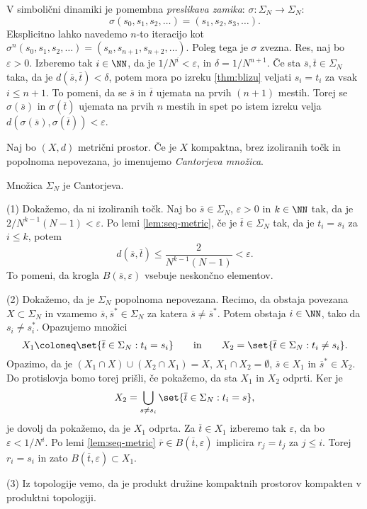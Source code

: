 V simbolični dinamiki je pomembna \emph{preslikava zamika}: \(\sigma \colon \Sigma_N \to \Sigma_N\):
\[\sigma (s_0, s_1, s_2, \dots) = (s_1, s_2, s_3, \dots).\]
Eksplicitno lahko navedemo \(n\)-to iteracijo kot \(\sigma^n (s_0, s_1, s_2, \dots) = (s_n, s_{n + 1}, s_{n + 2}, \dots)\). Poleg tega je \(\sigma\) zvezna. Res, naj bo \(\varepsilon > 0\). Izberemo tak \(i \in \NN\), da je \(1 / N^i < \varepsilon\), in \(\delta = 1 / N^{n + 1}\). Če sta \(\overline{s}, \overline{t} \in \Sigma_N\) taka, da je \(d(\overline{s}, \overline{t}) < \delta\), potem mora po izreku \ref{thm:blizu} veljati \(s_i = t_i\) za vsak \(i \leq n + 1\). To pomeni, da se \(\overline{s}\) in \(\overline{t}\) ujemata na prvih \((n + 1)\) mestih. Torej se \(\sigma (\overline{s})\) in \(\sigma (\overline{t})\) ujemata na prvih \(n\) mestih in spet po istem izreku velja \(d (\sigma (\overline{s}), \sigma (\overline{t})) < \varepsilon\).

\begin{definicija}
    Naj bo \((X, d)\) metrični prostor. Če je \(X\) kompaktna, brez izoliranih točk in popolnoma nepovezana, jo imenujemo \emph{Cantorjeva množica}.
\end{definicija}

\begin{trditev}
    Množica \(\Sigma_N\) je Cantorjeva.
\end{trditev}

\begin{dokaz}
    (1) Dokažemo, da ni izoliranih točk. Naj bo \(\overline{s} \in \Sigma_N\), \(\varepsilon > 0\) in \(k \in \NN\) tak, da je \(2/N^{k - 1} (N -1) < \varepsilon\). Po lemi \ref{lem:seq-metric}, če je \(\overline{t} \in \Sigma_N\) tak, da je \(t_i = s_i\) za \(i \leq k\), potem
    \[d (\overline{s}, \overline{t}) \leq \frac{2}{N^{k - 1} (N - 1)} < \varepsilon.\]
    To pomeni, da krogla \(B (\overline{s}, \varepsilon)\) vsebuje neskončno elementov.

    (2) Dokažemo, da je \(\Sigma_N\) popolnoma nepovezana. Recimo, da obstaja povezana \(X \subset \Sigma_N\) in vzamemo \(\overline{s}, \overline{s}^* \in \Sigma_N\) za katera \(\overline{s} \neq \overline{s}^*\). Potem obstaja \(i \in \NN\), tako da \(s_i \neq s_i^*\). Opazujemo množici
    \[X_1 \coloneq \set{\overline{t} \in \Sigma_N : t_i = s_i} \qquad \text{in} \qquad X_2 = \set{\overline{t} \in \Sigma_N : t_i \neq s_i}.\]
    Opazimo, da je \((X_1 \cap X) \cup (X_2 \cap X_1) = X\), \(X_1 \cap X_2 = \emptyset\), \(\overline{s} \in X_1\) in \(\overline{s}^* \in X_2\). Do protislovja bomo torej prišli, če pokažemo, da sta \(X_1\) in \(X_2\) odprti. Ker je
    \[X_2 = \bigcup_{s \neq s_i} \set{\overline{t} \in \Sigma_N : t_i = s},\]
    je dovolj da pokažemo, da je \(X_1\) odprta. Za \(\overline{t} \in X_1\) izberemo tak \(\varepsilon\), da bo \(\varepsilon < 1 / N^i\). Po lemi \ref{lem:seq-metric} \(\overline{r} \in B (\overline{t}, \varepsilon)\) implicira \(r_j = t_j\) za \(j \leq i\). Torej \(r_i = s_i\) in zato \(B (\overline{t}, \varepsilon) \subset X_1\).

    (3) Iz topologije vemo, da je produkt družine kompaktnih prostorov kompakten v produktni topologiji.
\end{dokaz}

